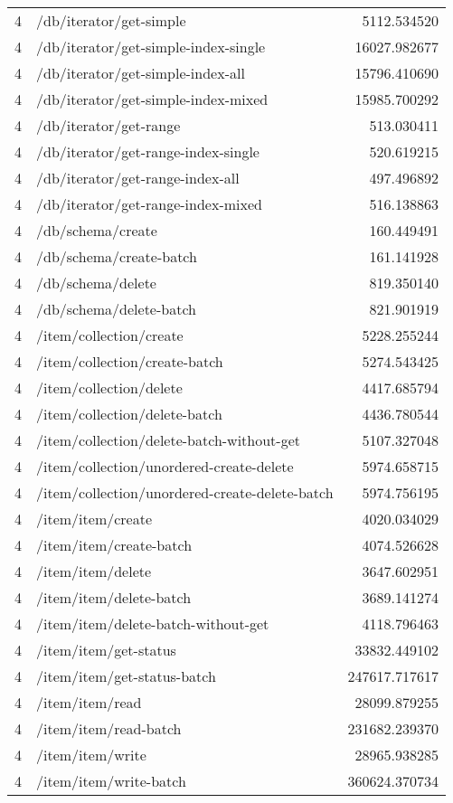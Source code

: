 \begin{longtable}{rlr}
4 & /db/iterator/get-simple & 5112.534520 \\
4 & /db/iterator/get-simple-index-single & 16027.982677 \\
4 & /db/iterator/get-simple-index-all & 15796.410690 \\
4 & /db/iterator/get-simple-index-mixed & 15985.700292 \\
4 & /db/iterator/get-range & 513.030411 \\
4 & /db/iterator/get-range-index-single & 520.619215 \\
4 & /db/iterator/get-range-index-all & 497.496892 \\
4 & /db/iterator/get-range-index-mixed & 516.138863 \\
4 & /db/schema/create & 160.449491 \\
4 & /db/schema/create-batch & 161.141928 \\
4 & /db/schema/delete & 819.350140 \\
4 & /db/schema/delete-batch & 821.901919 \\
4 & /item/collection/create & 5228.255244 \\
4 & /item/collection/create-batch & 5274.543425 \\
4 & /item/collection/delete & 4417.685794 \\
4 & /item/collection/delete-batch & 4436.780544 \\
4 & /item/collection/delete-batch-without-get & 5107.327048 \\
4 & /item/collection/unordered-create-delete & 5974.658715 \\
4 & /item/collection/unordered-create-delete-batch & 5974.756195 \\
4 & /item/item/create & 4020.034029 \\
4 & /item/item/create-batch & 4074.526628 \\
4 & /item/item/delete & 3647.602951 \\
4 & /item/item/delete-batch & 3689.141274 \\
4 & /item/item/delete-batch-without-get & 4118.796463 \\
4 & /item/item/get-status & 33832.449102 \\
4 & /item/item/get-status-batch & 247617.717617 \\
4 & /item/item/read & 28099.879255 \\
4 & /item/item/read-batch & 231682.239370 \\
4 & /item/item/write & 28965.938285 \\
4 & /item/item/write-batch & 360624.370734 \\

\end{longtable}
